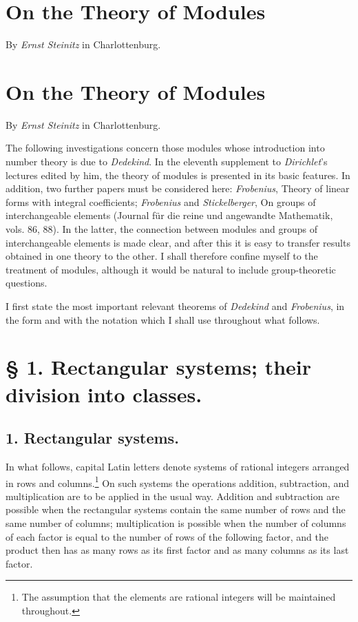 \documentclass[11pt,a4paper]{article}
\begin{document}
\section*{On the Theory of Modules}
\begin{center}
By \emph{Ernst Steinitz} in Charlottenburg.
\end{center}
\section*{On the Theory of Modules}
\begin{center}
By \emph{Ernst Steinitz} in Charlottenburg.
\end{center}

The following investigations concern those modules whose introduction into number theory is due to \emph{Dedekind}. In the eleventh supplement to \emph{Dirichlet}'s lectures edited by him, the theory of modules is presented in its basic features. In addition, two further papers must be considered here: \emph{Frobenius}, Theory of linear forms with integral coefficients; \emph{Frobenius} and \emph{Stickelberger}, On groups of interchangeable elements (Journal für die reine und angewandte Mathematik, vols. 86, 88). In the latter, the connection between modules and groups of interchangeable elements is made clear, and after this it is easy to transfer results obtained in one theory to the other. I shall therefore confine myself to the treatment of modules, although it would be natural to include group-theoretic questions.

I first state the most important relevant theorems of \emph{Dedekind} and \emph{Frobenius}, in the form and with the notation which I shall use throughout what follows.

\section*{§ 1. Rectangular systems; their division into classes.}

\subsection*{1. Rectangular systems.}

In what follows, capital Latin letters denote systems of rational integers arranged in rows and columns.\footnote{The assumption that the elements are rational integers will be maintained throughout.} On such systems the operations addition, subtraction, and multiplication are to be applied in the usual way. Addition and subtraction are possible when the rectangular systems contain the same number of rows and the same number of columns; multiplication is possible when the number of columns of each factor is equal to the number of rows of the following factor, and the product then has as many rows as its first factor and as many columns as its last factor.
\end{document}
